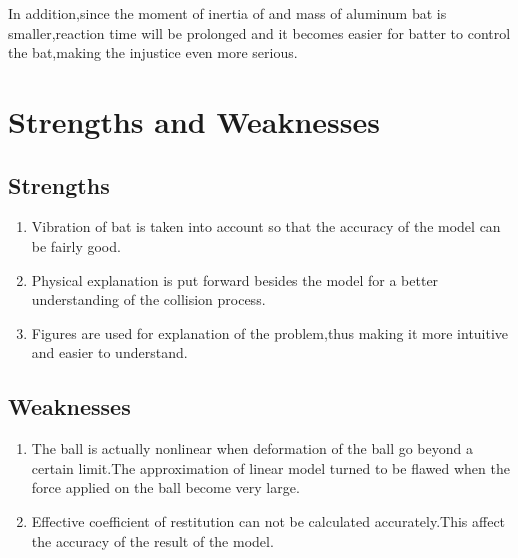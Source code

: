 \documentclass[12pt]{article}
\begin{document}
In addition,since the moment of inertia of and mass of aluminum bat is smaller,reaction time will be prolonged and it
becomes easier for batter to control the bat,making the injustice even more serious.

\section{Strengths and Weaknesses}

\subsection{Strengths}
\begin{enumerate}
\item Vibration of bat is taken into account so that the accuracy of the model can be fairly good.
\item Physical explanation is put forward besides the model for a better understanding of the collision process.
\item Figures are used for explanation of the problem,thus making it more intuitive and easier to understand.
\end{enumerate}

\subsection{Weaknesses}
\begin{enumerate}
\item The ball is actually nonlinear when deformation of the ball go beyond a certain limit.The approximation of linear model turned to be flawed when the force applied on the ball become very large.
\item Effective coefficient of restitution can not be calculated accurately.This affect the accuracy of the result of the model.
\end{enumerate}

\newpage
\end{document}

